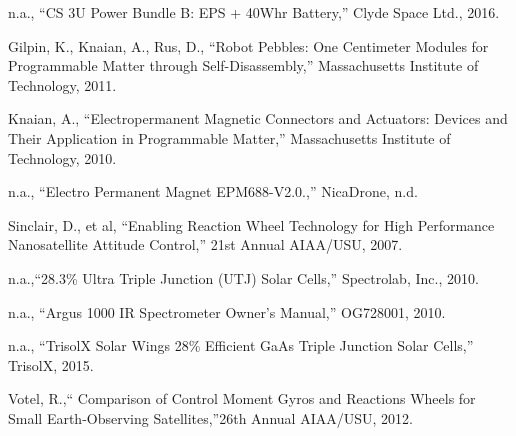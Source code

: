\documentclass[nocover]            %
{CSLI}                       %
\begin{document}
\begin{thebibliography}{}

 n.a., ``CS 3U Power Bundle B: EPS + 40Whr Battery,'' Clyde Space Ltd., 2016.

 Gilpin, K., Knaian, A., Rus, D., ``Robot Pebbles: One Centimeter Modules for Programmable Matter through Self-Disassembly,'' Massachusetts Institute of Technology, 2011.

 Knaian, A., ``Electropermanent Magnetic Connectors and Actuators: Devices and Their Application in Programmable Matter,'' Massachusetts Institute of Technology, 2010.

 n.a., ``Electro Permanent Magnet EPM688-V2.0.,'' NicaDrone, n.d.

 Sinclair, D., et al, ``Enabling Reaction Wheel Technology for High Performance Nanosatellite Attitude Control,'' 21st Annual AIAA/USU, 2007.

 n.a.,``28.3\% Ultra Triple Junction (UTJ) Solar Cells,'' Spectrolab, Inc., 2010.

 n.a., ``Argus 1000 IR Spectrometer Owner's Manual,'' OG728001, 2010.

 n.a., ``TrisolX Solar Wings 28\% Efficient GaAs Triple Junction Solar Cells,'' TrisolX, 2015.

 Votel, R.,`` Comparison of Control Moment Gyros and Reactions Wheels for Small Earth-Observing Satellites,''26th Annual AIAA/USU, 2012. 

\end{thebibliography}
\end{document}
